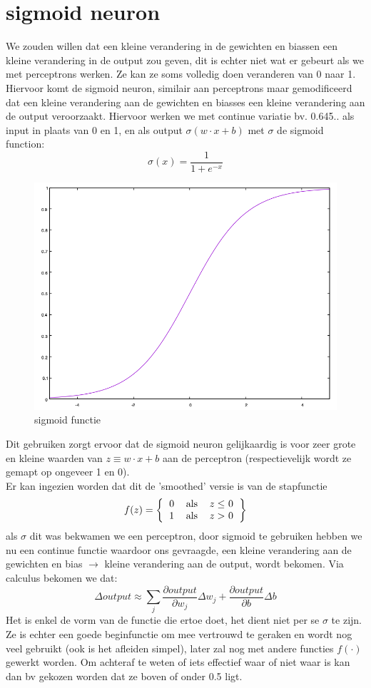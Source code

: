 \documentclass[10pt,a4paper,twoside]{article}
\begin{document}
\section{sigmoid neuron}
We zouden willen dat een kleine verandering in de gewichten en biassen een kleine verandering in de output zou geven, dit is echter niet wat er gebeurt als we met perceptrons werken. Ze kan ze soms volledig doen veranderen van 0 naar 1. Hiervoor komt de sigmoid neuron, similair aan perceptrons maar gemodificeerd dat een kleine verandering aan de gewichten en biasses een kleine verandering aan de output veroorzaakt. Hiervoor werken we met continue variatie bv. 0.645.. als input in plaats van 0 en 1, en als output $\sigma (w \cdot x + b)$ met $\sigma$ de sigmoid function:
\begin{equation*}
	\sigma(x) = \frac{1}{1+e^{-x}}
\end{equation*}
\begin{figure}[H]
	\centering
	\includegraphics[width=0.5\linewidth]{sigmoid.png}
	\caption{sigmoid functie}
\end{figure}
Dit gebruiken zorgt ervoor dat de sigmoid neuron gelijkaardig is voor zeer grote en kleine waarden van $z \equiv w \cdot x + b$ aan de perceptron (respectievelijk wordt ze gemapt op ongeveer 1 en 0).\\
Er kan ingezien worden dat dit de 'smoothed' versie is van de stapfunctie
\begin{equation}
f(z) = \left\{
	\begin{tabular}{ccc}
		0 & als & $z \leq$ 0 \\
		1 & als & $z >$ 0 \\
	\end{tabular}
\right\}
\end{equation}
als $\sigma$ dit was bekwamen we een perceptron, door sigmoid te gebruiken hebben we nu een continue functie waardoor ons gevraagde, een kleine verandering aan de gewichten en bias $\to$ kleine verandering aan de output, wordt bekomen. Via calculus bekomen we dat:
\begin{equation}
	\Delta output \approx \sum_{j}\frac{\partial output}{\partial w_j}\Delta w_j + \frac{\partial output}{\partial b} \Delta b
\end{equation} 
Het is enkel de vorm van de functie die ertoe doet, het dient niet per se $\sigma$ te zijn. Ze is echter een goede beginfunctie om mee vertrouwd te geraken en wordt nog veel gebruikt (ook is het afleiden simpel), later zal nog met andere functies $f(\cdot)$ gewerkt worden.
Om achteraf te weten of iets effectief waar of niet waar is kan dan bv gekozen worden dat ze boven of onder 0.5 ligt.
\end{document}
